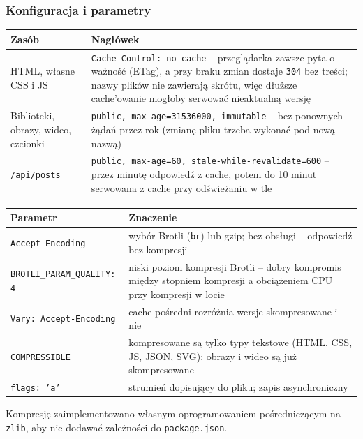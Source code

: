 \subsubsection{Konfiguracja i parametry}

\begin{tablehere}
\centering
\begin{tabular}{l p{9cm}}
\toprule
\textbf{Zasób} & \textbf{Nagłówek} \\
\midrule
HTML, własne CSS i JS & \texttt{Cache-Control: no-cache} -- przeglądarka zawsze pyta
  o ważność (ETag), a przy braku zmian dostaje \texttt{304} bez treści; nazwy plików
  nie zawierają skrótu, więc dłuższe cache'owanie mogłoby serwować nieaktualną wersję \\
Biblioteki, obrazy, wideo, czcionki & \texttt{public, max-age=31536000, immutable}
  -- bez ponownych żądań przez rok (zmianę pliku trzeba wykonać pod nową nazwą) \\
\texttt{/api/posts} & \texttt{public, max-age=60, stale-while-revalidate=600} --
  przez minutę odpowiedź z cache, potem do 10 minut serwowana z cache
  przy odświeżaniu w tle \\
\bottomrule
\end{tabular}
\caption{Polityka cache'owania}
\end{tablehere}

\begin{tablehere}
\centering
\begin{tabular}{l p{9cm}}
\toprule
\textbf{Parametr} & \textbf{Znaczenie} \\
\midrule
\texttt{Accept-Encoding} & wybór Brotli (\texttt{br}) lub gzip; bez obsługi -- odpowiedź bez kompresji \\
\texttt{BROTLI\_PARAM\_QUALITY: 4} & niski poziom kompresji Brotli -- dobry kompromis
  między stopniem kompresji a obciążeniem CPU przy kompresji w locie \\
\texttt{Vary: Accept-Encoding} & cache pośredni rozróżnia wersje skompresowane i nie \\
\texttt{COMPRESSIBLE} & kompresowane są tylko typy tekstowe (HTML, CSS, JS, JSON, SVG); obrazy i wideo
  są już skompresowane \\
\texttt{flags: 'a'} & strumień dopisujący do pliku; zapis asynchroniczny \\
\bottomrule
\end{tabular}
\caption{Parametry kompresji i logowania}
\end{tablehere}

Kompresję zaimplementowano własnym oprogramowaniem pośredniczącym na \texttt{zlib},
aby nie dodawać zależności do \texttt{package.json}.

